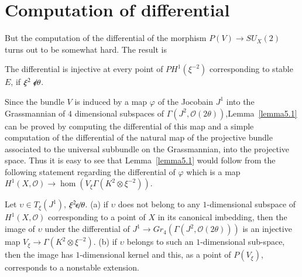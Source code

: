 \section{Computation of differential}\label{s5}

But the computation of the differential of the morphism $P(V)\to
SU_X(2)$ turns out to be somewhat hard. The result is 


\begin{lemma}\label{lemma5.1}
The differential is injective at every point of
$PH^{1}\left(\xi^{-2}\right)$ corresponding to stable $E$, if
$\xi^{2}\not\kern-2.5pt\epsilon \theta$. 
\end{lemma}

Since the bundle $V$ is induced by a map $\varphi$ of the Jocobain
$J^{1}$ into the Grassmannian of $4$ dimensional subspaces of
$\Gamma(J^{2},\mathscr{O}(2\theta))$,\pageoriginale Lemma~\ref{lemma5.1} can be
proved by computing the differential of this map and a simple
computation of the differential of the natural map of the projective
bundle associated to the universal subbundle on the Grassmannian, into
the projective space. Thus it is easy to see that Lemma~\ref{lemma5.1}
would follow from the following statement regarding the differential
of $\varphi$ which is a map $H^{1}(X,\mathscr{O})\to
\hom\left(V_{\xi}\Gamma\left(K^{2}\otimes \xi^{-2}\right)\right)$. 

\begin{lemma}\label{lemma5.2}
Let $\upsilon\in T_{\xi}\left(J^{1}\right)$, $\xi^{2}\!\not\!\!\!\epsilon~
\theta$. (a) if $\upsilon$ does not belong to any $1$-dimensional
subspace of $H^{1}(X,\mathscr{O})$ corresponding to a point of $X$ in
its canonical imbedding, then the image of $\upsilon$ under the
differential of $J^{1}\to
Gr_4\left(\Gamma\left(J^{2},\mathscr{O}(2\theta)\right)\right)$ is an injective
map $V_{\xi}\to \Gamma \left(K^{2}\otimes \xi^{-2}\right)$. (b) if
$\upsilon$ belongs to such an $1$-dimensional sub-space, then the
image has $1$-dimensional kernel and this, as a point of $P(V_{\xi})$,
corresponds to a nonstable extension. 
\end{lemma}


